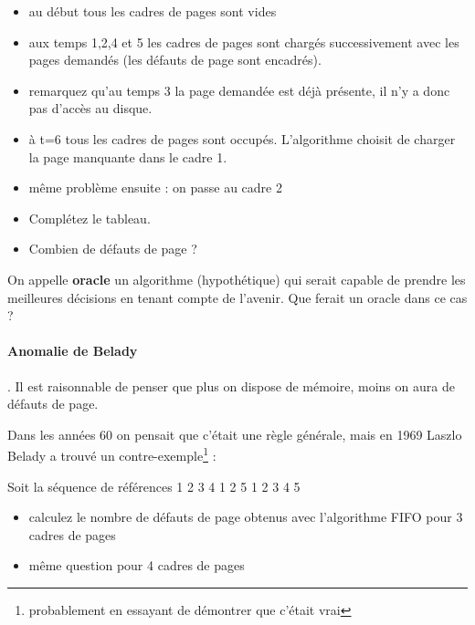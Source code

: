 \begin{multicols}{2}
\begin{itemize}
\item au début tous les cadres de  pages sont vides
\item aux temps 1,2,4 et 5 les cadres de pages sont chargés
  successivement avec les pages demandés (les défauts de page sont
  encadrés).
\item remarquez qu'au temps 3 la page demandée est déjà présente, il
  n'y a donc pas d'accès au disque.
\item à t=6 tous les cadres de pages sont occupés. L'algorithme
  choisit de charger la page manquante dans le cadre 1.
\item même problème ensuite : on passe au cadre 2
\end{itemize}

\begin{exercice}
\begin{itemize}
\item Complétez le tableau.
\item Combien de défauts de page ?
\end{itemize}
\end{exercice}

\begin{exercice} On appelle \textbf{oracle} un algorithme (hypothétique) qui serait capable de prendre les meilleures
décisions en tenant compte de l'avenir. Que ferait un oracle dans ce
cas ?
\end{exercice}

\paragraph{Anomalie de Belady}.  Il est raisonnable de penser
que plus on dispose de mémoire, moins on aura de défauts de
page. 

Dans les années 60 on pensait que c'était une règle générale, mais en
1969 Laszlo Belady a trouvé un contre-exemple\footnote{probablement en
essayant de démontrer que c'était vrai} :

\begin{exercice}
Soit la  séquence de références 1 2 3 4 1 2 5 1 2 3 4 5 
\begin{itemize}
\item calculez le nombre de défauts de page obtenus avec l'algorithme FIFO
pour 3 cadres de pages
\item même question pour 4 cadres de pages
\end{itemize}
\end{exercice}


\end{multicols}
